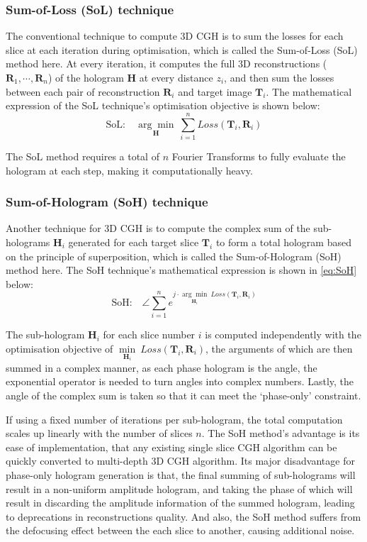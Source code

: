 \subsubsection{Sum-of-Loss (SoL) technique}
The conventional technique to compute 3D CGH is to sum the losses for each slice at each iteration during optimisation, which is called the Sum-of-Loss (SoL) method here. At every iteration, it computes the full 3D reconstructions ($\textbf{R}_1, \cdots, \textbf{R}_n$) of the hologram $\textbf{H}$ at every distance $z_i$, and then sum the losses between each pair of reconstruction $\textbf{R}_i$ and target image $\textbf{T}_i$. The mathematical expression of the SoL technique's optimisation objective is shown below:
\begin{equation}
	\text{SoL:}\quad \underset{\textbf{H}}{\arg \min}\ \sum_{i = 1}^{n} Loss(\textbf{T}_i, \textbf{R}_i)
\end{equation}

The SoL method requires a total of $n$ Fourier Transforms to fully evaluate the hologram at each step, making it computationally heavy.

\subsubsection{Sum-of-Hologram (SoH) technique}
Another technique for 3D CGH is to compute the complex sum of the sub-holograms $\textbf{H}_i$ generated for each target slice $\textbf{T}_i$ to form a total hologram based on the principle of superposition, which is called the Sum-of-Hologram (SoH) method here. The SoH technique's mathematical expression is shown in \cref{eq:SoH} below:
\begin{equation}
	\text{SoH:}\quad \angle \sum_{i = 1}^{n} e^{j \cdot \underset{\textbf{H}_i}{\arg \min}\ Loss(\textbf{T}_i, \textbf{R}_i)}
	\label{eq:SoH}
\end{equation}

The sub-hologram $\textbf{H}_i$ for each slice number $i$ is computed independently with the optimisation objective of $\underset{\textbf{H}_i}{\min}\ Loss(\textbf{T}_i, \textbf{R}_i)$, the arguments of which are then summed in a complex manner, as each phase hologram is the angle, the exponential operator is needed to turn angles into complex numbers. Lastly, the angle of the complex sum is taken so that it can meet the `phase-only' constraint.

If using a fixed number of iterations per sub-hologram, the total computation scales up linearly with the number of slices $n$. The SoH method's advantage is its ease of implementation, that any existing single slice CGH algorithm can be quickly converted to multi-depth 3D CGH algorithm. Its major disadvantage for phase-only hologram generation is that, the final summing of sub-holograms will result in a non-uniform amplitude hologram, and taking the phase of which will result in discarding the amplitude information of the summed hologram, leading to deprecations in reconstructions quality. And also, the SoH method suffers from the defocusing effect between the each slice to another, causing additional noise.

